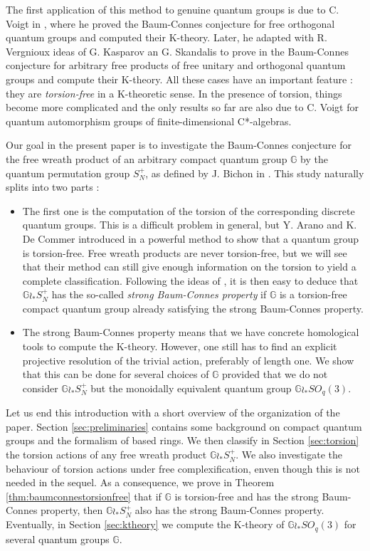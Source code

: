 \documentclass[a4paper, 11pt]{amsart}
\theoremstyle{plain}
\theoremstyle{definition}
\theoremstyle{remark}
\newcommand{\G}{\mathbb{G}}
\begin{document}
The first application of this method to genuine quantum groups is due to C. Voigt in \cite{voigt2011baum}, where he proved the Baum-Connes conjecture for free orthogonal quantum groups and computed their K-theory. Later, he adapted with R. Vergnioux ideas of G. Kasparov an G. Skandalis \cite{kasparov1991groups} to prove in \cite{vergnioux2013k} the Baum-Connes conjecture for arbitrary free products of free unitary and orthogonal quantum groups and compute their K-theory. All these cases have an important feature : they are \emph{torsion-free} in a K-theoretic sense. In the presence of torsion, things become more complicated and the only results so far are also due to C. Voigt \cite{voigt2015structure} for quantum automorphism groups of finite-dimensional C*-algebras.

Our goal in the present paper is to investigate the Baum-Connes conjecture for the free wreath product of an arbitrary compact quantum group $\G$ by the quantum permutation group $S_{N}^{+}$, as defined by J. Bichon in \cite{bichon2004free}. This study naturally splits into two parts :
\begin{itemize}
\item The first one is the computation of the torsion of the corresponding discrete quantum groups. This is a difficult problem in general, but Y. Arano and K. De Commer introduced in \cite{arano2015torsion} a powerful method to show that a quantum group is torsion-free. Free wreath products are never torsion-free, but we will see that their method can still give enough information on the torsion to yield a complete classification. Following the ideas of \cite{voigt2015structure}, it is then easy to deduce that $\G\wr_{\ast}S_{N}^{+}$ has the so-called \emph{strong Baum-Connes property} if $\G$ is a torsion-free compact quantum group already satisfying the strong Baum-Connes property.
\item The strong Baum-Connes property means that we have concrete homological tools to compute the K-theory. However, one still has to find an explicit projective resolution of the trivial action, preferably of length one. We show that this can be done for several choices of $\G$ provided that we do not consider $\G\wr_{\ast}S_{N}^{+}$ but the monoidally equivalent quantum group $\G\wr_{\ast}SO_{q}(3)$.
\end{itemize}

Let us end this introduction with a short overview of the organization of the paper. Section \ref{sec:preliminaries} contains some background on compact quantum groups and the formalism of based rings. We then classify in Section \ref{sec:torsion} the torsion actions of any free wreath product $\G\wr_{\ast}S_{N}^{+}$. We also investigate the behaviour of torsion actions under free complexification, enven though this is not needed in the sequel. As a consequence, we prove in Theorem \ref{thm:baumconnestorsionfree} that if $\G$ is torsion-free and has the strong Baum-Connes property, then $\G\wr_{\ast}S_{N}^{+}$ also has the strong Baum-Connes property. Eventually, in Section \ref{sec:ktheory} we compute the K-theory of $\G\wr_{\ast}SO_{q}(3)$ for several quantum groups $\G$.
\end{document}
